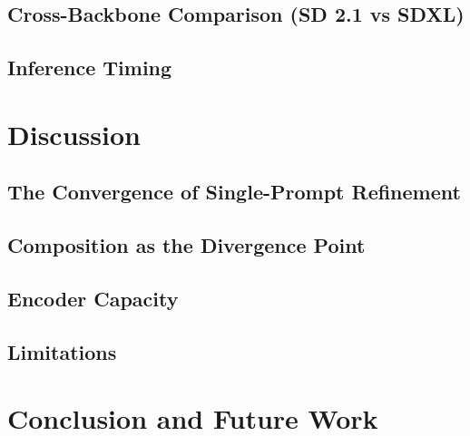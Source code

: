 \documentclass[a4paper,twoside,12pt]{report}
\begin{document}
\section{Cross-Backbone Comparison (SD 2.1 vs SDXL)}

\section{Inference Timing}

\chapter{Discussion}
\label{ch:discussion}

\section{The Convergence of Single-Prompt Refinement}

\section{Composition as the Divergence Point}

\section{Encoder Capacity}

\section{Limitations}

\chapter{Conclusion and Future Work}
\label{ch:conclusion}

\nocite{*}
\end{document}
